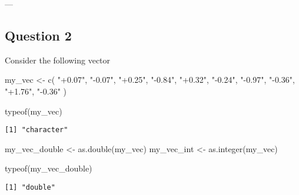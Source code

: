 \documentclass[
  letterpaper,
  DIV=11,
  numbers=noendperiod]{scrartcl}
\newenvironment{Shaded}{\begin{snugshade}}{\end{snugshade}}
\newcommand{\FunctionTok}[1]{\textcolor[rgb]{0.28,0.35,0.67}{#1}}
\newcommand{\NormalTok}[1]{\textcolor[rgb]{0.00,0.23,0.31}{#1}}
\newcommand{\OtherTok}[1]{\textcolor[rgb]{0.00,0.23,0.31}{#1}}
\newcommand{\StringTok}[1]{\textcolor[rgb]{0.13,0.47,0.30}{#1}}
\begin{document}
---

\hypertarget{question-2}{%
\subsection{Question 2}\label{question-2}}

\begin{tcolorbox}[enhanced jigsaw, colback=white, bottomrule=.15mm, coltitle=black, rightrule=.15mm, toprule=.15mm, opacityback=0, title=\textcolor{quarto-callout-tip-color}{\faLightbulb}\hspace{0.5em}{30 points}, breakable, colbacktitle=quarto-callout-tip-color!10!white, opacitybacktitle=0.6, bottomtitle=1mm, colframe=quarto-callout-tip-color-frame, toptitle=1mm, leftrule=.75mm, arc=.35mm, titlerule=0mm, left=2mm]

\end{tcolorbox}

Consider the following vector

\begin{Shaded}
\begin{Highlighting}[]
\NormalTok{my\_vec }\OtherTok{\textless{}{-}} \FunctionTok{c}\NormalTok{(}
    \StringTok{"+0.07"}\NormalTok{,}
    \StringTok{"{-}0.07"}\NormalTok{,}
    \StringTok{"+0.25"}\NormalTok{,}
    \StringTok{"{-}0.84"}\NormalTok{,}
    \StringTok{"+0.32"}\NormalTok{,}
    \StringTok{"{-}0.24"}\NormalTok{,}
    \StringTok{"{-}0.97"}\NormalTok{,}
    \StringTok{"{-}0.36"}\NormalTok{,}
    \StringTok{"+1.76"}\NormalTok{,}
    \StringTok{"{-}0.36"}
\NormalTok{)}

\FunctionTok{typeof}\NormalTok{(my\_vec)}
\end{Highlighting}
\end{Shaded}

\begin{verbatim}
[1] "character"
\end{verbatim}

\begin{Shaded}
\begin{Highlighting}[]
\NormalTok{my\_vec\_double }\OtherTok{\textless{}{-}} \FunctionTok{as.double}\NormalTok{(my\_vec)}
\NormalTok{my\_vec\_int }\OtherTok{\textless{}{-}} \FunctionTok{as.integer}\NormalTok{(my\_vec)}

\FunctionTok{typeof}\NormalTok{(my\_vec\_double)}
\end{Highlighting}
\end{Shaded}

\begin{verbatim}
[1] "double"
\end{verbatim}
\end{document}
